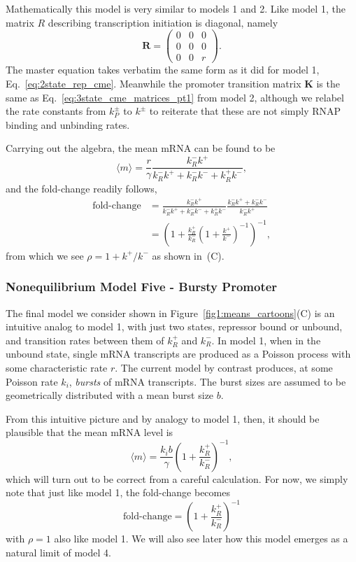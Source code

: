Mathematically this model is very similar to models 1 and 2. Like model 1, the
matrix $R$ describing transcription initiation is diagonal, namely
\begin{equation}
\mathbf{R} = \begin{pmatrix}
                0 & 0 & 0 \\ 
                0 & 0 & 0 \\ 
                0 & 0 & r
        \end{pmatrix}.
\end{equation}
The master equation takes verbatim the same form as it did for model 1,
Eq.~\ref{eq:2state_rep_cme}. Meanwhile the promoter transition
matrix $\mathbf{K}$ is the same as Eq.~\ref{eq:3state_cme_matrices_pt1}
from model 2, although we relabel the
rate constants from $k_P^\pm$ to $k^\pm$ to reiterate that these are not simply
RNAP binding and unbinding rates.

Carrying out the algebra, the mean mRNA can be found to be
\begin{equation}
\langle m\rangle = \frac{r}{\gamma}
\frac{k_R^- k^+}
{k_R^- k^+ + k_R^- k^- + k_R^+ k^-},
\end{equation}
and the fold-change readily follows,
\begin{align}
\text{fold-change}
&=      \frac{k_R^- k^+}{k_R^- k^+ + k_R^- k^- + k_R^+ k^-}
        \frac{k_R^- k^+ + k_R^- k^-}{k_R^- k^+}
\\
&=      \left(1 + \frac{k_R^+}{k_R^-}
                \left(1 + \frac{k^+}{k^-}\right)^{-1}
        \right)^{-1},
\end{align}
from which we see $\rho = 1 + k^+/k^-$ as shown in~(C).

\subsubsection{Nonequilibrium Model Five - Bursty Promoter}
The final model we consider shown in Figure~\ref{fig1:means_cartoons}(C) is an
intuitive analog to model 1, with just two states, repressor bound or unbound,
and transition rates between them of $k_R^+$ and $k_R^-$. In model 1, when in
the unbound state, single mRNA transcripts are produced as a Poisson process
with some characteristic rate $r$. The current model by contrast produces, at
some Poisson rate $k_i$, \textit{bursts} of mRNA transcripts.
The burst sizes are assumed to be geometrically distributed with
a mean burst size $b$.

From this intuitive picture and by analogy to model 1, then, it should be
plausible that the mean mRNA level is
\begin{equation}
\langle m\rangle = \frac{k_i b}{\gamma}
        \left(1 + \frac{k_R^+}{k_R^-}\right)^{-1},
\end{equation}
which will turn out to be correct from a careful calculation. For now, we simply
note that just like model 1, the fold-change becomes
\begin{equation}
\text{fold-change} = \left(1 + \frac{k_R^+}{k_R^-}\right)^{-1}
\end{equation}
with $\rho=1$ also like model 1.
We will also see later how this model emerges as a natural limit of model 4.

